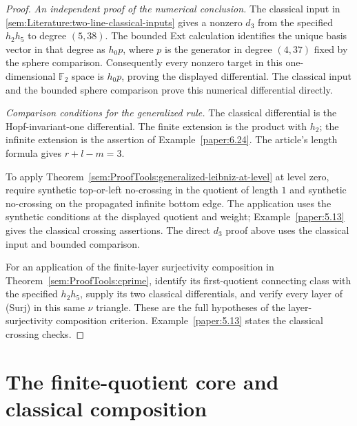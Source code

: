 \begin{proof}
\textit{An independent proof of the numerical conclusion.} The classical
input in \ref{sem:Literature:two-line-classical-inputs} gives a nonzero
$d_3$ from the specified $h_2h_5$ to degree $(5,38)$. The bounded Ext
calculation identifies the unique basis vector in that degree as $h_0p$,
where $p$ is the generator in degree $(4,37)$ fixed by the sphere comparison.
Consequently every nonzero target in this one-dimensional
$\mathbb F_2$ space is $h_0p$, proving the displayed differential.
The classical input and the bounded sphere comparison prove this
numerical differential directly.

\textit{Comparison conditions for the generalized rule.} The classical differential is the Hopf-invariant-one differential. The finite extension is the product with $h_2$; the infinite extension is the assertion of Example~\ref{paper:6.24}. The article's length formula gives $r+l-m=3$.

To apply Theorem~\ref{sem:ProofTools:generalized-leibniz-at-level}
at level zero, require synthetic top-or-left no-crossing in the
quotient of length $1$ and synthetic no-crossing on the propagated
infinite bottom edge. The application uses the synthetic conditions at the displayed quotient
and weight; Example~\ref{paper:5.13} gives the classical crossing assertions.
The direct $d_3$ proof above uses the classical input and bounded comparison.

For an application of the finite-layer surjectivity composition in
Theorem~\ref{sem:ProofTools:cprime}, identify its first-quotient
connecting class with the specified $h_2h_5$, supply its two classical
differentials, and verify every layer of (Surj) in this same
$\nu$ triangle. These are the full hypotheses of the layer-surjectivity composition
criterion. Example~\ref{paper:5.13} states the classical crossing checks.
\end{proof}

\section{The finite-quotient core and classical composition}

